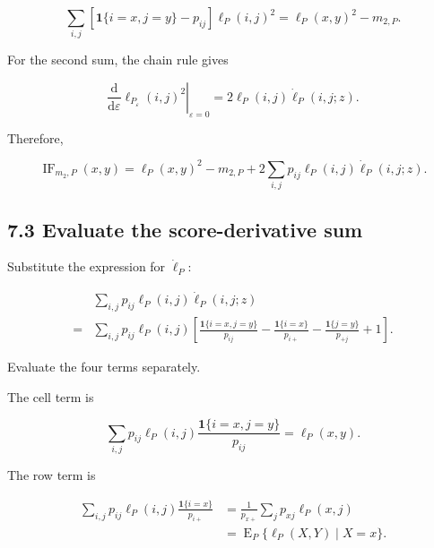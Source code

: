 \documentclass[
  11pt]{article}
\begin{document}
\begin{equation}
\sum_{i,j}
\left[\mathbf 1\{i=x,j=y\}-p_{ij}\right]\ell_P(i,j)^2
=\ell_P(x,y)^2-m_{2,P}.
\end{equation}

For the second sum, the chain rule gives

\begin{equation}
\left.
\frac{\mathrm d}{\mathrm d\varepsilon}
\ell_{P_\varepsilon}(i,j)^2
\right|_{\varepsilon=0}
=2\ell_P(i,j)\dot\ell_P(i,j;z).
\end{equation}

Therefore,

\begin{equation}
\operatorname{IF}_{m_2,P}(x,y)
=\ell_P(x,y)^2-m_{2,P}
+2\sum_{i,j}p_{ij}\ell_P(i,j)\dot\ell_P(i,j;z).
\end{equation}

\subsection{7.3 Evaluate the score-derivative
sum}\label{evaluate-the-score-derivative-sum}

Substitute the expression for \(\dot\ell_P\):

\begin{equation}
\begin{aligned}
&\sum_{i,j}p_{ij}\ell_P(i,j)\dot\ell_P(i,j;z)\\
={}&\sum_{i,j}p_{ij}\ell_P(i,j)
\left[
\frac{\mathbf 1\{i=x,j=y\}}{p_{ij}}
-\frac{\mathbf 1\{i=x\}}{p_{i+}}
-\frac{\mathbf 1\{j=y\}}{p_{+j}}
+1
\right].
\end{aligned}
\end{equation}

Evaluate the four terms separately.

The cell term is

\begin{equation}
\sum_{i,j}p_{ij}\ell_P(i,j)
\frac{\mathbf 1\{i=x,j=y\}}{p_{ij}}
=\ell_P(x,y).
\end{equation}

The row term is

\begin{equation}
\begin{aligned}
\sum_{i,j}p_{ij}\ell_P(i,j)
\frac{\mathbf 1\{i=x\}}{p_{i+}}
&=\frac{1}{p_{x+}}\sum_j p_{xj}\ell_P(x,j)\\
&=\operatorname E_P\{\ell_P(X,Y)\mid X=x\}.
\end{aligned}
\end{equation}
\end{document}
